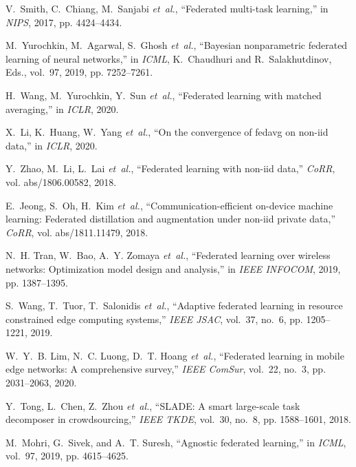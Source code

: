 \documentclass[11pt]{article}
\begin{document}
\begin{thebibliography}{10}
\begin{small}
		V.~Smith, C.~Chiang, M.~Sanjabi \emph{et~al.}, ``Federated multi-task
		learning,'' in \emph{NIPS}, 2017, pp. 4424--4434.
		
		M.~Yurochkin, M.~Agarwal, S.~Ghosh \emph{et~al.}, ``Bayesian nonparametric
		federated learning of neural networks,'' in \emph{ICML}, K.~Chaudhuri and
		R.~Salakhutdinov, Eds., vol.~97, 2019, pp. 7252--7261.
		
		H.~Wang, M.~Yurochkin, Y.~Sun \emph{et~al.}, ``Federated learning with matched
		averaging,'' in \emph{ICLR}, 2020.
		
		X.~Li, K.~Huang, W.~Yang \emph{et~al.}, ``On the convergence of fedavg on
		non-iid data,'' in \emph{ICLR}, 2020.
		
		Y.~Zhao, M.~Li, L.~Lai \emph{et~al.}, ``Federated learning with non-iid data,''
		\emph{CoRR}, vol. abs/1806.00582, 2018.
		
		E.~Jeong, S.~Oh, H.~Kim \emph{et~al.}, ``Communication-efficient on-device
		machine learning: Federated distillation and augmentation under non-iid
		private data,'' \emph{CoRR}, vol. abs/1811.11479, 2018.
		
		N.~H. Tran, W.~Bao, A.~Y. Zomaya \emph{et~al.}, ``Federated learning over
		wireless networks: Optimization model design and analysis,'' in \emph{IEEE
			INFOCOM}, 2019, pp. 1387--1395.
		
		S.~Wang, T.~Tuor, T.~Salonidis \emph{et~al.}, ``Adaptive federated learning in
		resource constrained edge computing systems,'' \emph{{IEEE} JSAC}, vol.~37,
		no.~6, pp. 1205--1221, 2019.
		
		W.~Y.~B. Lim, N.~C. Luong, D.~T. Hoang \emph{et~al.}, ``Federated learning in
		mobile edge networks: {A} comprehensive survey,'' \emph{{IEEE} ComSur},
		vol.~22, no.~3, pp. 2031--2063, 2020.
		
		Y.~Tong, L.~Chen, Z.~Zhou \emph{et~al.}, ``{SLADE:} {A} smart large-scale task
		decomposer in crowdsourcing,'' \emph{{IEEE} TKDE}, vol.~30, no.~8, pp.
		1588--1601, 2018.
		
		M.~Mohri, G.~Sivek, and A.~T. Suresh, ``Agnostic federated learning,'' in
		\emph{ICML}, vol.~97, 2019, pp. 4615--4625.
		

\end{small}
\end{thebibliography}
\end{document}
